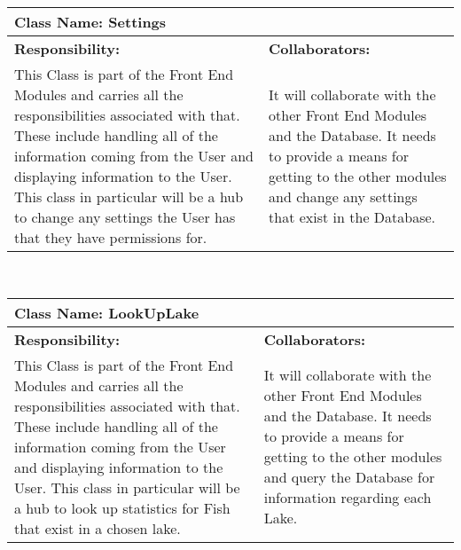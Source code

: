\documentclass[]{article}
\begin{document}
	\begin{table}[ht]
		\centering
		\begin{tabular}{|p{5cm}|p{5cm}|}
		\hline 
		 \multicolumn{2}{|l|}{\textbf{Class Name: Settings}} \\
		\hline
		\textbf{Responsibility:} & \textbf{Collaborators:} \\ \hline
		 This Class is part of the Front End Modules and carries all the responsibilities associated with that. These include handling all of the information coming from the User and displaying information to the User. This class in particular will be a hub to change any settings the User has that they have permissions for. & It will collaborate with the other Front End Modules and the Database. It needs to provide a means for getting to the other modules and change any settings that exist in the Database. \\
		\hline
		\end{tabular}
	\end{table}~\\

	\begin{table}[ht]
		\centering
		\begin{tabular}{| l | l |}
		\hline 
		 \multicolumn{2}{|l|}{\textbf{Class Name: LookUpLake}} \\
		\hline
		\textbf{Responsibility:} & \textbf{Collaborators:} \\ \hline
		This Class is part of the Front End Modules and carries all the responsibilities associated with that. These include handling all of the information coming from the User and displaying information to the User. This class in particular will be a hub to look up statistics for Fish that exist in a chosen lake. & It will collaborate with the other Front End Modules and the Database. It needs to provide a means for getting to the other modules and query the Database for information regarding each Lake. \\
		\hline
		\end{tabular}
	\end{table}~\\
	\pagebreak
\end{document}
